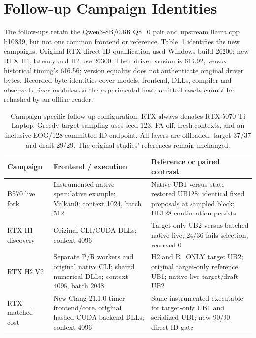 \section{Follow-up Campaign Identities}
\label{app:followupconfigs}

The follow-ups retain the Qwen3-8B/0.6B Q8\_0 pair and upstream llama.cpp b10839, but not one common frontend or reference. Table~\ref{tab:followupconfigs} identifies the new campaigns. Original RTX direct-ID qualification used Windows build 26200; new RTX H1, latency and H2 use 26300. Their driver version is 616.92, versus historical timing's 616.56; version equality does not authenticate original driver bytes. Recorded byte identities cover models, frontend, DLLs, compiler and observed driver modules on the experimental host; omitted assets cannot be rehashed by an offline reader.

\begin{table}[t]
\caption{Campaign-specific follow-up configuration. RTX always denotes RTX 5070 Ti Laptop. Greedy target sampling uses seed 123, FA off, fresh contexts, and an inclusive EOG/128 committed-ID endpoint. All layers are offloaded: target 37/37 and draft 29/29. The original studies' references remain unchanged.}
\label{tab:followupconfigs}
\centering
\begin{tabular}{>{\raggedright\arraybackslash}p{1.15in}>{\raggedright\arraybackslash}p{2.15in}>{\raggedright\arraybackslash}p{2.45in}}
\toprule
Campaign & Frontend / execution & Reference or paired contrast \\
\midrule
B570 live fork & Instrumented native speculative example; Vulkan0; context 1024, batch 512 & Native UB1 versus state-restored UB128; identical fixed proposals at sampled block; UB128 continuation persists \\
RTX H1 discovery & Original CLI/CUDA DLLs; context 4096 & Target-only UB2 versus batched native live; 24/36 fails selection, reserved 0 \\
RTX H2 V2 & Separate P/R workers and original native CLI; shared numerical DLLs; context 4096, batch 2048 & H2 and R\_ONLY target UB2; original target-only reference UB1; native live target/draft UB2 \\
RTX matched cost & New Clang 21.1.0 timer frontend/core, original hashed CUDA backend DLLs; context 4096 & Same instrumented executable for target-only UB1 and serialized UB1; new 90/90 direct-ID gate \\
\bottomrule
\end{tabular}
\end{table}

